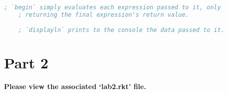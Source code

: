 \documentclass{article}
\begin{document}
\begin{lstlisting}[language=lisp,style=redStyle]
    ; `begin` simply evaluates each expression passed to it, only
    ; returning the final expression's return value.

    ; `displayln` prints to the console the data passed to it.
\end{lstlisting}


\section*{Part 2}
\begin{adjustwidth}{2em}{0em}
    \textbf{Please view the associated `lab2.rkt' file.} 
\end{adjustwidth}
\end{document}
